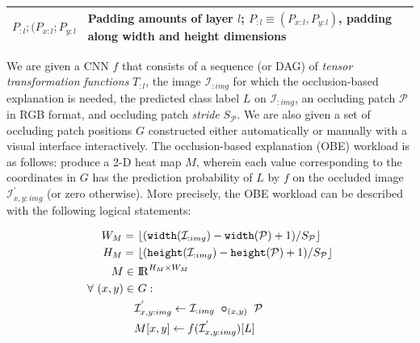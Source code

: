 \begin{table}[t]
{\begin{tabular}{p{2cm}p{7.5cm}}
    \midrule
    $P_{:l}; (P_{x:l}; P_{y:l}$ & Padding amounts of layer $l$; $P_{:l} \equiv (P_{x:l}, P_{y:l})$, padding along width and height dimensions\\
    \bottomrule
  \end{tabular}}
\label{table:preliminaries_symbols}
\end{table}

We are given a CNN $f$ that consists of a sequence (or DAG) of \textit{tensor transformation functions} $T_{:l}$, the image $\mathcal{I}_{:img}$ for which the occlusion-based explanation is needed, the predicted class label $L$ on $\mathcal{I}_{:img}$, an occluding patch $\mathcal{P}$ in RGB format, and occluding patch \textit{stride} $S_{\mathcal{P}}$. We are also given a set of occluding patch positions $G$ constructed either automatically or manually with a visual interface interactively.
The occlusion-based explanation (OBE) workload is as follows: produce a 2-D heat map $M$, wherein each value corresponding to the coordinates in $G$ has the prediction probability of $L$ by $f$ on the occluded image $\mathcal{I}^{'}_{x,y:img}$ (or zero otherwise).
More precisely, the OBE workload can be described with the following logical statements:

\vspace{-2mm}
\begin{align}
\label{eqn:mheight}
W_M =&~ \lfloor(\texttt{width}(\mathcal{I}_{:img}) - \texttt{width}(\mathcal{P}) + 1)/S_\mathcal{P}\rfloor\\
\label{eqn:mwidth}
H_M =&~ \lfloor(\texttt{height}(\mathcal{I}_{:img}) - \texttt{height}(\mathcal{P}) + 1)/S_\mathcal{P}\rfloor\\
M \in&~ \mathcal{\rm I\!R}^{H_M \times W_M}\\
\forall~ (x,y) \in&~ G:\\
\label{eqn:patchimpose}
& \mathcal{I}^{'}_{x,y:img} \leftarrow \mathcal{I}_{:img} ~ \bm\circ_{(x,y)} ~ \mathcal{P} \\
\label{eqn:outputval}
& M[x,y] \leftarrow f(\mathcal{I}^{'}_{x,y:img})[L]
\end{align}


